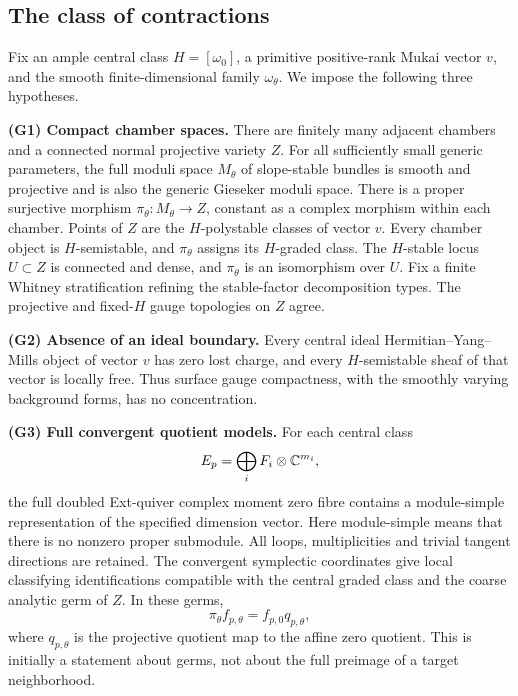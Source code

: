 \subsection{The class of contractions}\label{subsec:hypotheses}
Fix an ample central class \(H=[\omega_0]\), a primitive positive-rank
Mukai vector \(v\), and the smooth finite-dimensional family
\(\omega_\theta\). We impose the following three hypotheses.

\medskip\noindent
\textbf{(G1) Compact chamber spaces.}
There are finitely many adjacent chambers and a connected normal
projective variety \(Z\). For all sufficiently small generic parameters,
the full moduli space \(M_\theta\) of slope-stable bundles is smooth
and projective and is also the generic Gieseker moduli space.
There is a proper surjective morphism
\(\pi_\theta:M_\theta\to Z\), constant as a complex morphism within
each chamber. Points of \(Z\) are the \(H\)-polystable classes of
vector \(v\). Every chamber object is \(H\)-semistable, and
\(\pi_\theta\) assigns its \(H\)-graded class. The \(H\)-stable locus
\(U\subset Z\) is connected and dense, and \(\pi_\theta\) is an
isomorphism over \(U\). Fix a finite Whitney stratification refining
the stable-factor decomposition types. The projective and fixed-\(H\)
gauge topologies on \(Z\) agree.

\medskip\noindent
\textbf{(G2) Absence of an ideal boundary.}
Every central ideal Hermitian--Yang--Mills object of vector \(v\) has
zero lost charge, and every \(H\)-semistable sheaf of that vector is
locally free. Thus surface gauge compactness, with the smoothly varying
background forms, has no concentration.

\medskip\noindent
\textbf{(G3) Full convergent quotient models.}
For each central class
\[
 E_p=\bigoplus_i F_i\otimes\mathbb C^{m_i},
\]
the full doubled Ext-quiver complex moment zero fibre contains a
module-simple representation of the specified dimension vector.
Here module-simple means that there is no nonzero proper submodule.
All loops, multiplicities and trivial tangent directions are retained.
The convergent symplectic coordinates give local classifying
identifications compatible with the central graded class and the
coarse analytic germ of \(Z\). In these germs,
\begin{equation}\label{eq:classifying-diagram}
 \pi_\theta f_{p,\theta}=f_{p,0}q_{p,\theta},
\end{equation}
where \(q_{p,\theta}\) is the projective quotient map to the affine
zero quotient. This is initially a statement about germs, not about
the full preimage of a target neighborhood.

